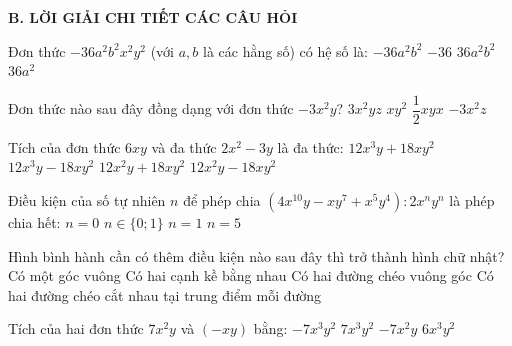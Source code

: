 \documentclass[12pt,a4paper]{article}
\begin{document}
\noindent\textbf{\large B. LỜI GIẢI CHI TIẾT CÁC CÂU HỎI}
\vspace{1mm}
\begin{ex}
Đơn thức $-36a^2b^2x^2y^2$ (với $a, b$ là các hằng số) có hệ số là:
\choice
{\True $-36a^2b^2$}
{$-36$}
{$36a^2b^2$}
{$36a^2$}
\end{ex}

\begin{ex}
Đơn thức nào sau đây đồng dạng với đơn thức $-3x^2y$?
\choice
{$3x^2yz$}
{$xy^2$}
{\True $\dfrac{1}{2}xyx$}
{$-3x^2z$}
\end{ex}

\begin{ex}
Tích của đơn thức $6xy$ và đa thức $2x^2 - 3y$ là đa thức:
\choice
{$12x^3y + 18xy^2$}
{\True $12x^3y - 18xy^2$}
{$12x^2y + 18xy^2$}
{$12x^2y - 18xy^2$}
\end{ex}

\begin{ex}
Điều kiện của số tự nhiên $n$ để phép chia $(4x^{10}y - xy^7 + x^5y^4) : 2x^n y^n$ là phép chia hết:
\choice
{$n = 0$}
{\True $n \in \{0; 1\}$}
{$n = 1$}
{$n = 5$}
\end{ex}

\begin{ex}
Hình bình hành cần có thêm điều kiện nào sau đây thì trở thành hình chữ nhật?
\choice
{\True Có một góc vuông}
{Có hai cạnh kề bằng nhau}
{Có hai đường chéo vuông góc}
{Có hai đường chéo cắt nhau tại trung điểm mỗi đường}
\end{ex}

\begin{ex}
Tích của hai đơn thức $7x^2y$ và $(-xy)$ bằng:
\choice
{\True $-7x^3y^2$}
{$7x^3y^2$}
{$-7x^2y$}
{$6x^3y^2$}
\end{ex}
\end{document}
